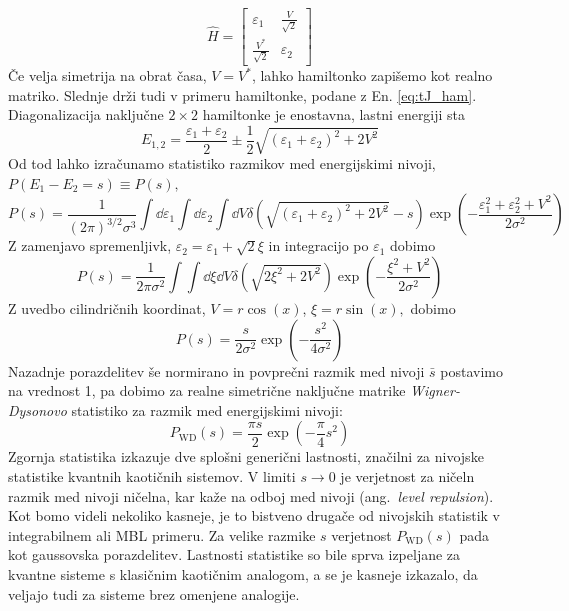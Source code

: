  \begin{equation}\label{eq:rnd_ham}
 \hat{H}=
 \begin{bmatrix}
 \varepsilon_1 & \frac{V}{\sqrt{2}} \\
 \frac{V^*}{\sqrt{2}} & \varepsilon_2
 \end{bmatrix}
 \end{equation}
 Če velja simetrija na obrat časa, $V=V^*$, lahko hamiltonko zapišemo kot realno matriko. Slednje drži tudi v primeru hamiltonke, podane z En. \eqref{eq:tJ_ham}. Diagonalizacija naključne $2\times2$ hamiltonke je enostavna, lastni energiji sta
 \begin{equation}
 E_{1,2}=\frac{\varepsilon_1+\varepsilon_2}{2}\pm \frac{1}{2}\sqrt{\left(\varepsilon_1 +\varepsilon_2\right)^2 + 2V^2}
 \end{equation}
 Od tod lahko izračunamo statistiko razmikov med energijskimi nivoji, $P(E_1-E_2=s)\equiv P(s),$
\begin{equation}
 P(s)=\frac{1}{\left(2\pi\right)^{3/2}\sigma^3}\int \dd\varepsilon_1\int\dd\varepsilon_2\int \dd V \delta\left(\sqrt{\left(\varepsilon_1 +\varepsilon_2\right)^2 + 2V^2}-s\right)\exp\left( -\frac{\varepsilon_1^2+\varepsilon_2^2+V^2}{2\sigma^2}\right)
 \end{equation}
 Z zamenjavo spremenljivk, $\varepsilon_2=\varepsilon_1+\sqrt{2}\xi$ in integracijo po $\varepsilon_1$ dobimo 
 \begin{equation}
 P(s)=\frac{1}{2\pi\sigma^2}\int\int\dd\xi\dd V\delta\left(\sqrt{2\xi^2+2V^2}\right)\exp\left(-\frac{\xi^2+V^2}{2\sigma^2}\right)
 \end{equation}
 Z uvedbo cilindričnih koordinat, $V=r\cos(x)$, $\xi=r\sin(x),$ dobimo 
 \begin{equation}\label{eq:wigner_surmise}
 P(s)=\frac{s}{2\sigma^2}\exp\left(-\frac{s^2}{4\sigma^2} \right)
\end{equation}
 Nazadnje porazdelitev še normirano in povprečni razmik med nivoji $\bar{s}$ postavimo na vrednost 1, pa dobimo za realne simetrične naključne matrike \emph{Wigner-Dysonovo} statistiko za razmik med energijskimi nivoji: 
 \begin{equation}\label{eq:wigner-dyson}
 P_\mathrm{WD}(s)=\frac{\pi s}{2}\exp\left(-\frac{\pi}{4}s^2\right)
 \end{equation}
 Zgornja statistika izkazuje dve splošni generični lastnosti, značilni za nivojske statistike kvantnih kaotičnih sistemov. V limiti $s\to 0$ je verjetnost za ničeln razmik med nivoji ničelna, kar kaže na odboj med nivoji (ang.~\emph{level repulsion}). Kot bomo videli nekoliko kasneje, je to bistveno drugače od nivojskih statistik v integrabilnem ali MBL primeru. Za velike razmike $s$ verjetnost $P_\mathrm{WD}(s)$ pada kot gaussovska porazdelitev. Lastnosti statistike so bile sprva izpeljane za kvantne sisteme s klasičnim kaotičnim analogom, a se je kasneje izkazalo, da veljajo tudi za sisteme brez omenjene analogije.\\\\
